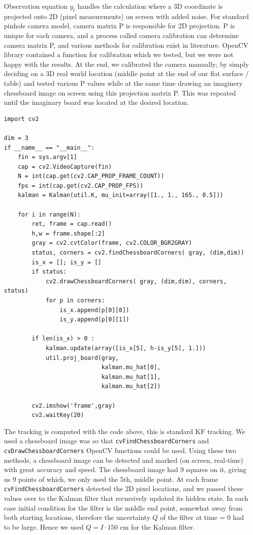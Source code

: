 \documentclass{article}
\begin{document}
Observation equation $y_t$ handles the calculation where a 3D coordinate is
projected onto 2D (pixel measurements) on screen with added noise. For standard
pinhole camera model, camera matrix P is responsible for 2D projection. P is
unique for each camera, and a process called camera calibration can determine
camera matrix P, and various methods for calibration exist in literature. OpenCV
library contained a function for calibration which we tested, but we were not
happy with the results. At the end, we calibrated the camera manually; by simply
deciding on a 3D real world location (middle point at the end of our flat
surface / table) and tested various P values while at the same time drawing an
imaginery chessboard image on screen using this projection matrix P. This was
repeated until the imaginary board was located at the desired location.

\begin{verbatim}
import cv2

dim = 3
if __name__ == "__main__":    
    fin = sys.argv[1]
    cap = cv2.VideoCapture(fin)
    N = int(cap.get(cv2.CAP_PROP_FRAME_COUNT))
    fps = int(cap.get(cv2.CAP_PROP_FPS))
    kalman = Kalman(util.K, mu_init=array([1., 1., 165., 0.5]))
    
    for i in range(N):
        ret, frame = cap.read()
        h,w = frame.shape[:2]
        gray = cv2.cvtColor(frame, cv2.COLOR_BGR2GRAY)
        status, corners = cv2.findChessboardCorners( gray, (dim,dim))
        is_x = []; is_y = []
        if status: 
            cv2.drawChessboardCorners( gray, (dim,dim), corners, status)
            for p in corners:
                is_x.append(p[0][0])
                is_y.append(p[0][1])

        if len(is_x) > 0 : 
            kalman.update(array([is_x[5], h-is_y[5], 1.]))
            util.proj_board(gray, 
                            kalman.mu_hat[0], 
                            kalman.mu_hat[1], 
                            kalman.mu_hat[2])

        cv2.imshow('frame',gray)
        cv2.waitKey(20)    
\end{verbatim}

The tracking is computed with the code above, this is standard KF tracking.  We
used a chessboard image was so that \verb!cvFindChessboardCorners!  and
\verb!cvDrawChessboardCorners! OpenCV functions could be used. Using these two
methods, a chessboard image can be detected and marked (on screen, real-time)
with great accuracy and speed. The chessboard image had 9 squares on it, giving
us 9 points of which, we only used the 5th, middle point. At each frame
\verb!cvFindChessboardCorners! detected the 2D pixel locations, and we passed
these values over to the Kalman filter that recursively updated its hidden
state. In each case initial condition for the filter is the middle end point,
somewhat away from both starting locations, therefore the uncertainty $Q$ of the
filter at time = 0 had to be large. Hence we used $Q = I \cdot 150$ cm for the
Kalman filter.
\end{document}
